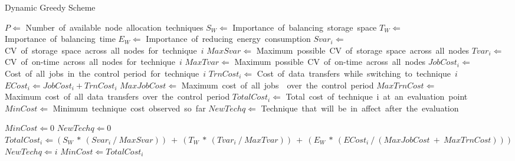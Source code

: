 \begin{algorithm}[!htbp]
\caption{Dynamic Greedy Scheme}
\label{greedyapp}
\begin{algorithmic}[1]
    \STATE $P \Leftarrow$ Number\ of\ available\ node\ allocation\ techniques
    \STATE $S_W \Leftarrow$ Importance\ of\ balancing\ storage\ space
    \STATE $T_W \Leftarrow$ Importance\ of\ balancing\ time
    \STATE $E_W \Leftarrow$ Importance\ of\ reducing\ energy\ consumption
    \STATE $Svar_i \Leftarrow$ CV\ of\ storage\ space\ across\ all\ nodes\ for\ technique\ $i$
    \STATE $MaxSvar \Leftarrow$ Maximum\ possible\ CV\ of\ storage\ space\ across\ all\ nodes
    \STATE $Tvar_i \Leftarrow$ CV\ of\ on-time\ across\ all\ nodes\ for\ technique\ $i$
    \STATE $MaxTvar \Leftarrow$ Maximum\ possible\ CV\ of\ on-time\ across\ all\ nodes
    \STATE $JobCost_i \Leftarrow$ Cost\ of\ all\ jobs\ in\ the\ control\ period\ for\ technique\ $i$
    \STATE $TrnCost_i \Leftarrow$ Cost\ of\ data\ transfers\ while\ switching\ to\ technique\ $i$
    \STATE $ECost_i \Leftarrow JobCost_i + TrnCost_i$
    \STATE $MaxJobCost \Leftarrow$ Maximum\ cost\ of\ all\ jobs\ \ over\ the\ control\ period
    \STATE $MaxTrnCost \Leftarrow$ Maximum\ cost\ of\ all\ data\ transfers\ over\ the\ control\ period
    \STATE $TotalCost_i \Leftarrow$ Total\ cost\ of\ technique\ i\ at\ an\ evaluation\ point
    \STATE $MinCost \Leftarrow$ Minimum\ technique\ cost\ observed\ so\ far
    \STATE $NewTechq \Leftarrow$ Technique\ that\ will\ be\ in\ affect\ after\ the\ evaluation

    \STATE $MinCost \Leftarrow 0$
    \STATE $NewTechq \Leftarrow 0$
        \STATE $TotalCost_i \Leftarrow (S_W\ *\ (Svar_i\ /\ MaxSvar))\ +\ (T_W\ *\ (Tvar_i\ /\ MaxTvar))\ +\ (E_W\ *\ (ECost_i\ /\ (MaxJobCost\ +\ MaxTrnCost)))$
            \STATE $NewTechq \Leftarrow i$
            \STATE $MinCost \Leftarrow TotalCost_i$
        \ENDIF
    \ENDFOR
\end{algorithmic}
\end{algorithm}

